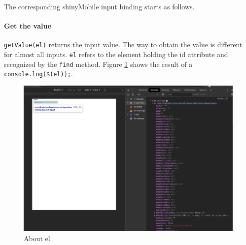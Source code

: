 \documentclass[]{book}
\newenvironment{Shaded}{\begin{snugshade}}{\end{snugshade}}
\newcommand{\AttributeTok}[1]{\textcolor[rgb]{0.77,0.63,0.00}{#1}}
\newcommand{\CommentTok}[1]{\textcolor[rgb]{0.56,0.35,0.01}{\textit{#1}}}
\newcommand{\DataTypeTok}[1]{\textcolor[rgb]{0.13,0.29,0.53}{#1}}
\newcommand{\KeywordTok}[1]{\textcolor[rgb]{0.13,0.29,0.53}{\textbf{#1}}}
\newcommand{\NormalTok}[1]{#1}
\newcommand{\OperatorTok}[1]{\textcolor[rgb]{0.81,0.36,0.00}{\textbf{#1}}}
\newcommand{\VariableTok}[1]{\textcolor[rgb]{0.00,0.00,0.00}{#1}}
\let\oldparagraph\paragraph
\renewcommand{\paragraph}[1]{\oldparagraph{#1}\mbox{}}
\begin{document}
The corresponding shinyMobile input binding starts as follows.

\begin{Shaded}
\end{Shaded}

\hypertarget{get-the-value}{%
\paragraph{Get the value}\label{get-the-value}}

\texttt{getValue(el)} returns the input value. The way to obtain the value is different for almost all inputs. \texttt{el} refers to the element holding the id attribute and recognized by the \texttt{find} method. Figure \ref{fig:shiny-el} shows the result of a \texttt{console.log(\$(el));}.

\begin{figure}
\includegraphics[width=35.5in]{images/survival-kit/shiny-el} \caption{About el}\label{fig:shiny-el}
\end{figure}
\end{document}
